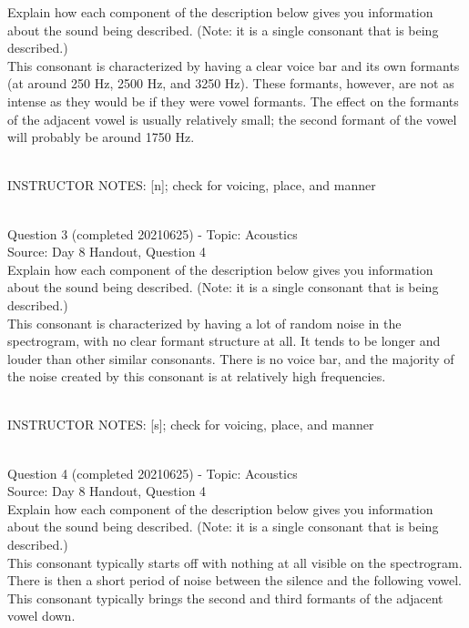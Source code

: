 \documentclass[12pt]{article}
\begin{document}
Explain how each component of the description below gives you information about the sound being described. (Note: it is a single consonant that is being described.)\\

This consonant is characterized by having a clear voice bar and its own formants (at around 250 Hz, 2500 Hz, and 3250 Hz). These formants, however, are not as intense as they would be if they were vowel formants. The effect on the formants of the adjacent vowel is usually relatively small; the second formant of the vowel will probably be around 1750 Hz.


~\\
INSTRUCTOR NOTES: [n]; check for voicing, place, and manner


~\\

{\large Question 3} (completed 20210625) - Topic: Acoustics\\
Source: Day 8 Handout, Question 4\\

Explain how each component of the description below gives you information about the sound being described. (Note: it is a single consonant that is being described.)\\

This consonant is characterized by having a lot of random noise in the spectrogram, with no clear formant structure at all. It tends to be longer and louder than other similar consonants. There is no voice bar, and the majority of the noise created by this consonant is at relatively high frequencies.


~\\
INSTRUCTOR NOTES: [s]; check for voicing, place, and manner


~\\

{\large Question 4} (completed 20210625) - Topic: Acoustics\\
Source: Day 8 Handout, Question 4\\

Explain how each component of the description below gives you information about the sound being described. (Note: it is a single consonant that is being described.)\\

This consonant typically starts off with nothing at all visible on the spectrogram. There is then a short period of noise between the silence and the following vowel. This consonant typically brings the second and third formants of the adjacent vowel down.
\end{document}
